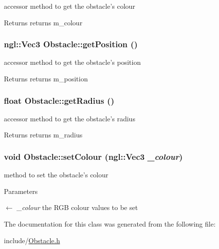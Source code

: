 accessor method to get the obstacle's colour \begin{DoxyReturn}{Returns}
returns m\_\-colour 
\end{DoxyReturn}
\hypertarget{classObstacle_a9454af032c08064469f0c4a63dbcf860}{
\subsubsection[{getPosition}]{\setlength{\rightskip}{0pt plus 5cm}ngl::Vec3 Obstacle::getPosition ()}}
\label{classObstacle_a9454af032c08064469f0c4a63dbcf860}


accessor method to get the obstacle's position \begin{DoxyReturn}{Returns}
returns m\_\-position 
\end{DoxyReturn}
\hypertarget{classObstacle_a6b6bb129cfe0a8434bb4231f34aebf82}{
\subsubsection[{getRadius}]{\setlength{\rightskip}{0pt plus 5cm}float Obstacle::getRadius ()}}
\label{classObstacle_a6b6bb129cfe0a8434bb4231f34aebf82}


accessor method to get the obstacle's radius \begin{DoxyReturn}{Returns}
returns m\_\-radius 
\end{DoxyReturn}
\hypertarget{classObstacle_ab041ef36674a8c2df9119fc5a3f9b89b}{
\subsubsection[{setColour}]{\setlength{\rightskip}{0pt plus 5cm}void Obstacle::setColour (ngl::Vec3 {\em \_\-colour})}}
\label{classObstacle_ab041ef36674a8c2df9119fc5a3f9b89b}


method to set the obstacle's colour 
\begin{DoxyParams}{Parameters}
\item[\mbox{$\leftarrow$} {\em \_\-colour}]the RGB colour values to be set \end{DoxyParams}


The documentation for this class was generated from the following file:\begin{DoxyCompactItemize}
\item 
include/\hyperlink{Obstacle_8h}{Obstacle.h}\end{DoxyCompactItemize}
